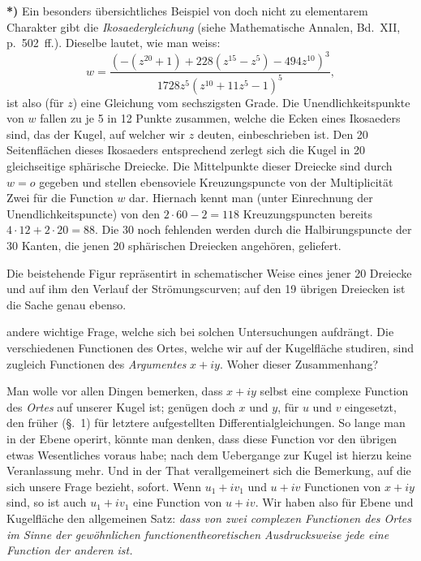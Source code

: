 \documentclass{article}
\begin{document}
\textbf{*)} Ein besonders übersichtliches Beispiel von doch nicht zu elementarem Charakter gibt die \emph{Ikosaedergleichung} (siehe Mathematische Annalen, Bd.~XII, p.~502~ff.). Dieselbe lautet, wie man weiss:
\[ w = \frac{(-(z^{20} + 1) + 228(z^{15} - z^{5}) - 494z^{10})^{3}}{1728z^{5}(z^{10} + 11z^{5} - 1)^{5}}, \]
ist also (für $z$) eine Gleichung vom sechszigsten Grade. Die Unendlichkeitspunkte von $w$ fallen zu je 5 in 12 Punkte zusammen, welche die Ecken eines Ikosaeders sind, das der Kugel, auf welcher wir $z$ deuten, einbeschrieben ist. Den 20 Seitenflächen dieses Ikosaeders entsprechend zerlegt sich die Kugel in 20 gleichseitige sphärische Dreiecke. Die Mittelpunkte dieser Dreiecke sind durch $w = o$ gegeben und stellen ebensoviele Kreuzungspuncte von der Multiplicität Zwei für die Function $w$ dar. Hiernach kennt man (unter Einrechnung der Unendlichkeitspuncte) von den $2 \cdot 60 - 2 = 118$ Kreuzungspuncten bereits $4 \cdot 12 + 2 \cdot 20 = 88$. Die 30 noch fehlenden werden durch die Halbirungspuncte der 30 Kanten, die jenen 20 sphärischen Dreiecken angehören, geliefert.


Die beistehende Figur repräsentirt in schematischer Weise eines jener 20 Dreiecke und auf ihm den Verlauf der Strömungscurven; auf den 19 übrigen Dreiecken ist die Sache genau ebenso.

andere wichtige Frage, welche sich bei solchen Untersuchungen aufdrängt. Die verschiedenen Functionen des Ortes, welche wir auf der Kugelfläche studiren, sind zugleich Functionen des \emph{Argumentes} $x + iy$. Woher dieser Zusammenhang?

Man wolle vor allen Dingen bemerken, dass $x + iy$ selbst eine complexe Function des \emph{Ortes} auf unserer Kugel ist; genügen doch $x$ und $y$, für $u$ und $v$ eingesetzt, den früher (§.~1) für letztere aufgestellten Differentialgleichungen. So lange man in der Ebene operirt, könnte man denken, dass diese Function vor den übrigen etwas Wesentliches voraus habe; nach dem Uebergange zur Kugel ist hierzu keine Veranlassung mehr. Und in der That verallgemeinert sich die Bemerkung, auf die sich unsere Frage bezieht, sofort. Wenn $u_{1} + iv_{1}$ und $u + iv$ Functionen von $x + iy$ sind, so ist auch $u_{1} + iv_{1}$ eine Function von $u + iv$. Wir haben also für Ebene und Kugelfläche den allgemeinen Satz: \emph{dass von zwei complexen Functionen des Ortes im Sinne der gewöhnlichen functionentheoretischen Ausdrucksweise jede eine Function der anderen ist.}
\end{document}

